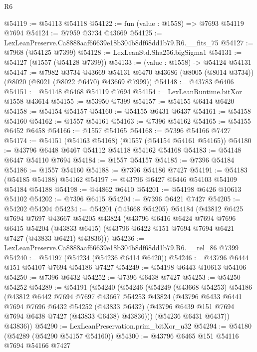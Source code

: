 \begin{lexlean}{R6}
\begin{coremodule}
@54119 := @54113 @54118
@54122 := fun (value : @1558) => @7693 @54119 @7694
@54124 := @7959 @3734 @43669
@54125 := LexLeanPreserve.Ca8888aaf66639e18b304b8df68dd1b79.R6.__fits_75
@54127 := @7968 (@54125 @7399)
@54128 := LexLeanStd.Sha256.bigSigma1
@54131 := @54127 (@1557 (@54128 @7399))
@54133 := (value : @1558) -> @54124 @54131
@54147 := @7982
    @3734
    @43669
    @54131
    @6470
    @43686
    (@8005 (@8014 @3734))
    (@8020 (@8021 (@8022 @6470) @43669 @7999))
@54148 := @43783 @6406
@54151 := @54148 @6468 @54119 @7694
@54154 := LexLeanRuntime.bitXor @1558 @43614
@54155 := @53950 @7399
@54157 := @54155 @6414 @6420
@54158 := @54154 @54157
@54160 := @54155 @6431 @6437
@54161 := @54158 @54160
@54162 := @1557 @54161
@54163 := @7396 @54162
@54165 := @54155 @6452 @6458
@54166 := @1557 @54165
@54168 := @7396 @54166 @7427
@54174 := @54151 (@54163 @54168) (@1557 (@54154 @54161 @54165))
@54180 := @43796 @6448 @6467 @54112 @54118 @54162 @54168
@54183 := @54148 @6447 @54110 @7694
@54184 := @1557 @54157
@54185 := @7396 @54184
@54186 := @1557 @54160
@54188 := @7396 @54186 @7427
@54191 := @54183 (@54185 @54188) @54162
@54197 := @43796 @6427 @6446 @54103 @54109 @54184 @54188
@54198 := @44862 @6410
@54201 := @54198 @6426 @10613 @54102
@54202 := @7396 @6415
@54204 := @7396 @6421 @7427
@54205 := @54202 @54204
@54234 := @54201
    (@43668 @54205)
    @54184
    (@43812
      @6425
      @7694
      @7697
      @43667
      @54205
      @43824
      (@43796
        @6416
        @6424
        @7694
        @7696
        @6415
        @54204
        (@43833 @6415)
        (@43796 @6422 @151 @7694 @7694 @6421 @7427 (@43833 @6421) @43836)))
@54236 := LexLeanPreserve.Ca8888aaf66639e18b304b8df68dd1b79.R6.__rel_86 @7399
@54240 := @54197 (@54234 (@54236 @6414 @6420))
@54246 := @43796 @6444 @151 @54107 @7694 @54186 @7427
@54249 := @54198 @6443 @10613 @54106
@54250 := @7396 @6432
@54252 := @7396 @6438 @7427
@54253 := @54250 @54252
@54289 := @54191
    (@54240
      (@54246
        (@54249
          (@43668 @54253)
          @54186
          (@43812
            @6442
            @7694
            @7697
            @43667
            @54253
            @43824
            (@43796
              @6433
              @6441
              @7694
              @7696
              @6432
              @54252
              (@43833 @6432)
              (@43796 @6439 @151 @7694 @7694 @6438 @7427 (@43833 @6438) @43836)))
          (@54236 @6431 @6437))
        @43836))
@54290 := LexLeanPreservation.prim_bitXor_u32
@54294 := @54180 (@54289 (@54290 @54157 @54160))
@54300 := @43796 @6465 @151 @54116 @7694 @54166 @7427

\end{coremodule}
\end{lexlean}
